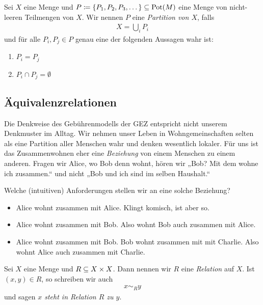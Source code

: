 \begin{defin}
  Sei $X$ eine Menge und $P \coloneqq \{ P_{1}, P_{2}, P_{3}, \dots \}
  \subseteq \operatorname{Pot}(M)$ eine Menge von nicht-leeren Teilmengen von $X$. Wir nennen
  $P$ eine \emph{Partition von $X$}, falls
  \begin{align*}
    X = \bigcup_{i}P_{i}
  \end{align*}
  und für alle $P_{i},P_{j} \in P$ genau eine der folgenden Aussagen wahr
  ist:
  \begin{enumerate}
    \item $P_{i} = P_{j}$
    \item $P_{i} \cap P_{j} = \emptyset$
  \end{enumerate}
\end{defin}

\subsection{Äquivalenzrelationen}

Die Denkweise des Gebührenmodells der GEZ entspricht nicht unserem
Denkmuster im Alltag. Wir nehmen unser Leben in Wohngemeinschaften selten
als eine Partition aller Menschen wahr und denken wesentlich lokaler. Für
uns ist das Zusammenwohnen eher eine \emph{Beziehung} von einem Menschen zu
einem anderen. Fragen wir Alice, wo Bob denn wohnt, hören wir „Bob? Mit dem
wohne ich zusammen.“ und nicht „Bob und ich sind im selben Haushalt.“

Welche (intuitiven) Anforderungen stellen wir an eine solche Beziehung?

\begin{itemize}
  \item Alice wohnt zusammen mit Alice. Klingt komisch, ist aber so.
  \item Alice wohnt zusammen mit Bob. Also wohnt Bob auch zusammen mit
    Alice.
  \item Alice wohnt zusammen mit Bob. Bob wohnt zusammen mit mit
    Charlie. Also wohnt Alice auch zusammen mit Charlie.
\end{itemize}


\begin{defin}

  Sei $X$ eine Menge und $R \subseteq X\times X$. Dann nennen wir $R$ eine
  \emph{Relation} auf $X$. Ist $(x,y)\in R$, so schreiben wir auch
  \begin{align*}
    x \sim_{R} y
  \end{align*}
  und sagen \emph{$x$ steht in Relation $R$ zu $y$}.

\end{defin}

